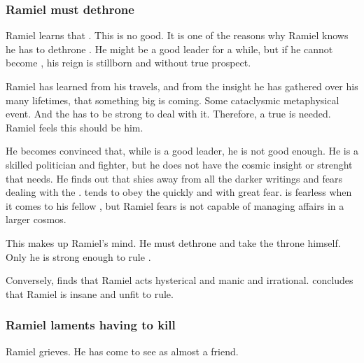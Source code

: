 \subsubsection{Ramiel must dethrone \Dasteron}
Ramiel learns that . 
This is no good. 
It is one of the reasons why Ramiel knows he has to dethrone \Dasteron. 
He might be a good leader for a while, but if he cannot become \apex{}, his reign is stillborn and without true prospect. 

Ramiel has learned from his travels, and from the insight he has gathered over his many lifetimes, that something big is coming. 
Some cataclysmic metaphysical event. 
And the \Mystraacht{} \matrix{} has to be strong to deal with it. 
Therefore, a true \apex{} is needed. 
Ramiel feels this \apex{} should be him. 

He becomes convinced that, while \Dasteron is a good leader, he is not good enough.
He is a skilled politician and fighter, but he does not have the cosmic insight or \vertex strenght that \Mystraacht needs.
He finds out that \Dasteron shies away from all the darker writings and fears dealing with the \banes.
\Dasteron tends to obey the \banes quickly and with great fear.
\Dasteron is fearless when it comes to his fellow \resphain, but Ramiel fears \Dasteron is not capable of managing \resphan affairs in a larger cosmos.

This makes up Ramiel's mind.
He must dethrone \Dasteron and take the throne himself.
Only he is strong enough to rule \Mystraacht. 

Conversely, \Dasteron finds that Ramiel acts hysterical and manic and irrational.
\Dasteron concludes that Ramiel is insane and unfit to rule. 





\subsubsection{Ramiel laments having to kill \Dasteron}
Ramiel grieves. 
He has come to see \Dasteron as almost a friend. 


